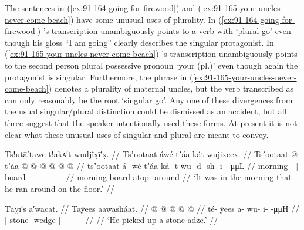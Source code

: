 The sentences in (\ref{ex:91-164-going-for-firewood}) and (\ref{ex:91-165-your-uncles-never-come-beach}) have some unusual uses of plurality.
In (\ref{ex:91-164-going-for-firewood}) \citeauthor{swanton:1909}’s transcription  unambiguously points to a verb with  ‘plural go’ even though his gloss “I am going” clearly describes the singular protagonist.
In (\ref{ex:91-165-your-uncles-never-come-beach}) \citeauthor{swanton:1909}’s transcription  unambiguously points to the second person plural possessive pronoun  ‘your (pl.)’ even though again the protagonist is singular.
Furthermore, the phrase  in (\ref{ex:91-165-your-uncles-never-come-beach}) denotes a plurality of maternal uncles, but the verb transcribed as  can only reasonably be the root  ‘singular go’.
Any one of these divergences from the usual singular/plural distinction could be dismissed as an accident, but all three suggest that the speaker intentionally used these forms.
At present it is not clear what these unusual uses of singular and plural are meant to convey.

\ex\label{ex:91-166-morning-run-around-floor}%
%
\begingl
	\glpreamble	Ts!utā′tawe t!akᴀ′t wudjîx̣ī′x̣. //
	\glpreamble	Tsʼootaat áwé tʼáa kát wujixeex. //
	\gla	Tsʼootaat  @ {}
		{} tʼáa  @ {} {}
		 @ {} @ {} @ {} @ {} @ {} //
	\glb	tsʼootaat á -wé
		{} tʼáa ká -t {} 
		wu- d- sh- i-  -μμL //
	\glc	morning  -
		{}[ board  - {}]
		- - - -  - //
	\gld	morning  {}
		{} board atop -around {}
		 {} {} {} {} {} //
	\glft	‘It was in the morning that he ran around on the floor.’
		//
\endgl
\xe

\ex\label{ex:91-167-grabbed-stone-adze}%
%
\begingl
	\glpreamble	Tāỵī′s ā′wacāt. //
	\glpreamble	Taÿees aawasháat. //
	\gla	{}  @ {} {}  @ {} @ {} @ {} @ {} //
	\glb	{} té- ÿees {} a- wu- i-  -μμH //
	\glc	{}[ stone- wedge {}]
		- - -  - //
	\gld	{}  {} {}  {} {} {} {} //
	\glft	‘He picked up a stone adze.’
		//
\endgl
\xe


